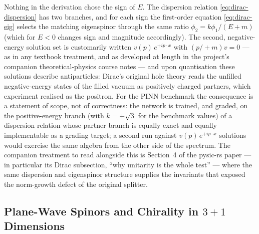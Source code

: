 Nothing in the derivation chose the sign of $E$. The dispersion relation
\eqref{eq:dirac-dispersion} has two branches, and for each sign the
first-order equation \eqref{eq:dirac-eig} selects the matching eigenspinor
through
the same ratio $\phi_2 = k\phi_1/(E+m)$ (which for $E<0$ changes sign and
magnitude accordingly). The second, negative-energy solution set is
customarily written $v(p)\, e^{+ip\cdot x}$ with $(p\!\!\!/ + m)v = 0$ ---
as in any textbook treatment, and as developed at length in the project's
companion theoretical-physics course notes --- and upon quantisation these
solutions describe antiparticles: Dirac's original hole theory reads the
unfilled negative-energy states of the filled vacuum as positively charged
partners, which experiment realised as the positron. For the PINN benchmark
the consequence is a statement of scope, not of correctness: the network is
trained, and graded, on the positive-energy branch (with $k = +\sqrt{3}$ for
the benchmark values) of a
dispersion relation whose partner branch is equally exact and equally
implementable as a grading target; a second run against
$v(p)\,e^{+ip\cdot x}$ solutions would exercise the same algebra from the
other side of the spectrum.  The companion treatment to read alongside this
is Section~4 of the pysic-rs paper --- in particular its Dirac subsection,
``why unitarity is the whole test'' --- where the same dispersion and
eigenspinor structure supplies the invariants that exposed the norm-growth
defect of the original splitter.

\subsection{Plane-Wave Spinors and Chirality in $3+1$ Dimensions}
\label{sec:dirac-spinors-31}


